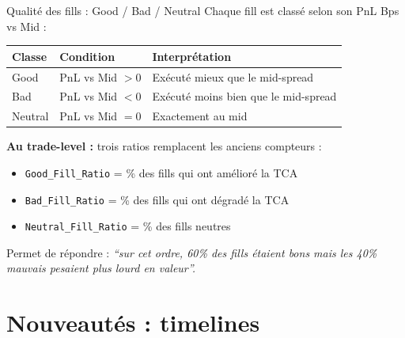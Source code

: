 \documentclass[10pt]{beamer}
\begin{document}
\begin{frame}{Qualité des fills : Good / Bad / Neutral}
Chaque fill est classé selon son PnL Bps vs Mid :

\vspace{0.3cm}
\begin{tabular}{lll}
\toprule
\textbf{Classe} & \textbf{Condition} & \textbf{Interprétation} \\
\midrule
Good & PnL vs Mid $> 0$ & Exécuté mieux que le mid-spread \\
Bad & PnL vs Mid $< 0$ & Exécuté moins bien que le mid-spread \\
Neutral & PnL vs Mid $= 0$ & Exactement au mid \\
\bottomrule
\end{tabular}

\vspace{0.3cm}
\textbf{Au trade-level :} trois ratios remplacent les anciens compteurs :
\begin{itemize}
    \item \texttt{Good\_Fill\_Ratio} = \% des fills qui ont amélioré la TCA
    \item \texttt{Bad\_Fill\_Ratio} = \% des fills qui ont dégradé la TCA
    \item \texttt{Neutral\_Fill\_Ratio} = \% des fills neutres
\end{itemize}

\vspace{0.2cm}
Permet de répondre : \textit{``sur cet ordre, 60\% des fills étaient bons mais les 40\% mauvais pesaient plus lourd en valeur''.}
\end{frame}

\section{Nouveautés : timelines}
\end{document}
